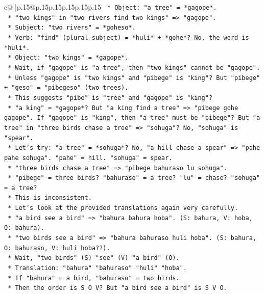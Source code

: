 \documentclass{article}
\begin{document}
{\begin{supertabular}{c@{$\;$}|p{.15\linewidth}@{}p{.15\linewidth}p{.15\linewidth}p{.15\linewidth}p{.15\linewidth}p{.15\linewidth}}
{{{\texttt{            *   Object: "a tree" = *gagope*.} \\
\texttt{        *   "two kings" in "two rivers find two kings" => "gagope".} \\
\texttt{            *   Subject: "two rivers" = *goheso*.} \\
\texttt{            *   Verb: "find" (plural subject) = *huli* + *gohe*? No, the word is *huli*.} \\
\texttt{            *   Object: "two kings" = *gagope*.} \\
\texttt{            *   Wait, if "gagope" is "a tree", then "two kings" cannot be "gagope".} \\
\texttt{            *   Unless "gagope" is "two kings" and "pibege" is "king"? But "pibege" + "geso" = "pibegeso" (two trees).} \\
\texttt{            *   This suggests "pibe" is "tree" and "gagope" is "king"?} \\
\texttt{            *   "a king" = *gagope*? But "a king find a tree" => "pibege gohe gagope". If "gagope" is "king", then "a tree" must be "pibege"? But "a tree" in "three birds chase a tree" => "sohuga"? No, "sohuga" is "spear".} \\
\texttt{            *   Let's try: "a tree" = *sohuga*? No, "a hill chase a spear" => "pahe pahe sohuga". "pahe" = hill. "sohuga" = spear.} \\
\texttt{            *   "three birds chase a tree" => "pibege bahuraso lu sohuga".} \\
\texttt{                *   "pibege" = three birds? "bahuraso" = a tree? "lu" = chase? "sohuga" = a tree?} \\
\texttt{                *   This is inconsistent.} \\
\texttt{    *   Let's look at the provided translations again very carefully.} \\
\texttt{        *   "a bird see a bird" => "bahura bahura hoba". (S: bahura, V: hoba, O: bahura).} \\
\texttt{        *   "two birds see a bird" => "bahura bahuraso huli hoba". (S: bahura, O: bahuraso, V: huli hoba??).} \\
\texttt{            *   Wait, "two birds" (S) "see" (V) "a bird" (O).} \\
\texttt{            *   Translation: "bahura" "bahuraso" "huli" "hoba".} \\
\texttt{            *   If "bahura" = a bird, "bahuraso" = two birds.} \\
\texttt{            *   Then the order is S O V? But "a bird see a bird" is S V O.} \\
}}}
\end{supertabular}}
\end{document}
